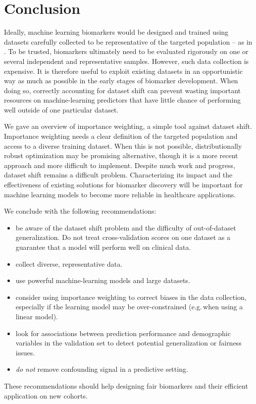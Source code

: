\documentclass[a4paper,num-refs]{oup-contemporary}
\newcommand{\eg}{e.g.\,}
\begin{document}
\section{Conclusion}
%
Ideally, machine learning biomarkers would be designed and trained using
datasets carefully collected to be representative of the
targeted population -- as in \citet{liu2020sensitive}.
%
To be trusted, biomarkers ultimately need to be evaluated rigorously on one or several
independent and representative samples.
%
However, such data collection is expensive. It is therefore useful to
exploit existing datasets in an opportunistic way as much as possible in the
early stages of biomarker development.
%
When doing so, correctly accounting for dataset shift can prevent wasting
important resources on machine-learning predictors that have little chance of
performing well outside of one particular dataset.
%

We gave an overview of importance weighting, a simple tool against dataset
shift.
%
Importance weighting needs a clear definition of the targeted population and
access to a diverse training dataset. When this is not possible,
distributionally robust optimization may be promising alternative, though it
is a more recent approach and more difficult to implement.
%
Despite much work and progress, dataset shift remains a difficult problem.
Characterizing its impact and the effectiveness of existing solutions for biomarker discovery will be important for machine learning models to become more reliable in healthcare applications.

We conclude with the following recommendations:
\begin{itemize}
  \item be aware of the dataset shift problem and the difficulty of out-of-dataset generalization. Do not treat cross-validation scores on one dataset as a guarantee that a model will perform well on clinical data.
  \item collect diverse, representative data.
  \item use powerful machine-learning models and large datasets.
  \item consider using importance weighting to correct biases in the data
collection, especially if the learning model may be over-constrained (\eg when using a linear model).
  \item look for associations between prediction performance and demographic variables in the validation set to detect potential generalization or fairness issues.
  \item \emph{do not} remove confounding signal in a predictive setting.
\end{itemize}
These recommendations should help designing fair biomarkers and their efficient application on new cohorts.
\end{document}

